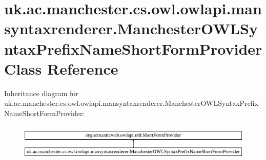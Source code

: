 \hypertarget{classuk_1_1ac_1_1manchester_1_1cs_1_1owl_1_1owlapi_1_1mansyntaxrenderer_1_1_manchester_o_w_l_syn9b805e7397984f62b2f3f095697b987e}{\section{uk.\-ac.\-manchester.\-cs.\-owl.\-owlapi.\-mansyntaxrenderer.\-Manchester\-O\-W\-L\-Syntax\-Prefix\-Name\-Short\-Form\-Provider Class Reference}
\label{classuk_1_1ac_1_1manchester_1_1cs_1_1owl_1_1owlapi_1_1mansyntaxrenderer_1_1_manchester_o_w_l_syn9b805e7397984f62b2f3f095697b987e}
}
Inheritance diagram for uk.\-ac.\-manchester.\-cs.\-owl.\-owlapi.\-mansyntaxrenderer.\-Manchester\-O\-W\-L\-Syntax\-Prefix\-Name\-Short\-Form\-Provider\-:\begin{figure}[H]
\begin{center}
\leavevmode
\includegraphics[height=1.797753cm]{classuk_1_1ac_1_1manchester_1_1cs_1_1owl_1_1owlapi_1_1mansyntaxrenderer_1_1_manchester_o_w_l_syn9b805e7397984f62b2f3f095697b987e}
\end{center}
\end{figure}
